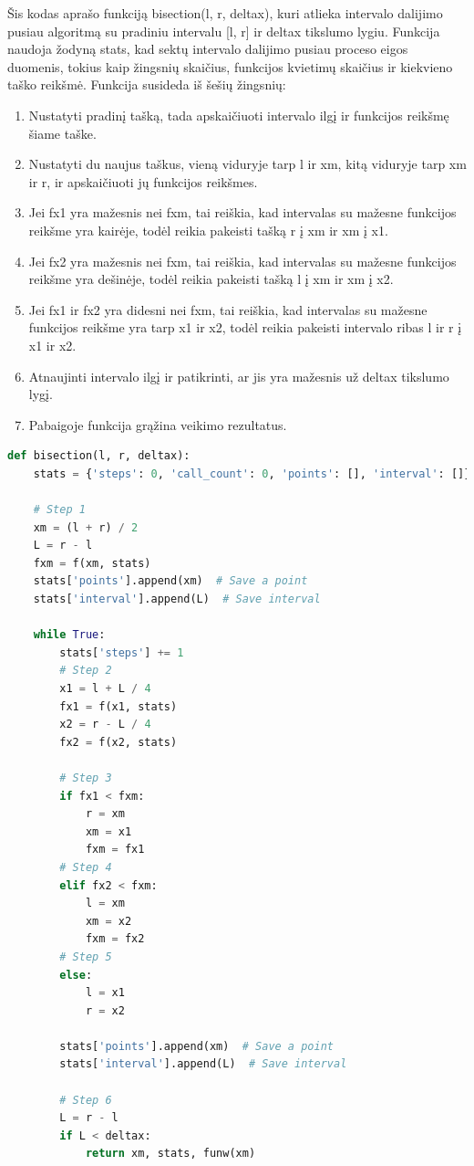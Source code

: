 \documentclass{VUMIFPSkursinis}
\begin{document}
Šis kodas aprašo funkciją bisection(l, r, deltax), kuri atlieka intervalo dalijimo pusiau algoritmą su pradiniu intervalu [l, r] ir deltax tikslumo lygiu. Funkcija naudoja žodyną stats, kad sektų intervalo dalijimo pusiau proceso eigos duomenis, tokius kaip žingsnių skaičius, funkcijos kvietimų skaičius ir kiekvieno taško reikšmė. Funkcija susideda iš šešių žingsnių:
\begin{enumerate}
  \item Nustatyti pradinį tašką, tada apskaičiuoti intervalo ilgį ir funkcijos reikšmę šiame taške.
  \item Nustatyti du naujus taškus, vieną viduryje tarp l ir xm, kitą viduryje tarp xm ir r,
        ir apskaičiuoti jų funkcijos reikšmes.
  \item Jei fx1 yra mažesnis nei fxm, tai reiškia, kad intervalas su mažesne funkcijos reikšme yra kairėje,
        todėl reikia pakeisti tašką r į xm ir xm į x1.
  \item Jei fx2 yra mažesnis nei fxm, tai reiškia, kad intervalas su mažesne funkcijos reikšme yra dešinėje,
        todėl reikia pakeisti tašką l į xm ir xm į x2.
  \item Jei fx1 ir fx2 yra didesni nei fxm, tai reiškia, kad intervalas su mažesne funkcijos
        reikšme yra tarp x1 ir x2, todėl reikia pakeisti intervalo ribas l ir r į x1 ir x2.
  \item Atnaujinti intervalo ilgį ir patikrinti, ar jis yra mažesnis už deltax tikslumo lygį.
  \item Pabaigoje funkcija grąžina veikimo rezultatus.
\end{enumerate}

\begin{lstlisting}[language=Python]
def bisection(l, r, deltax):
    stats = {'steps': 0, 'call_count': 0, 'points': [], 'interval': []}

    # Step 1
    xm = (l + r) / 2
    L = r - l
    fxm = f(xm, stats)
    stats['points'].append(xm)  # Save a point
    stats['interval'].append(L)  # Save interval

    while True:
        stats['steps'] += 1
        # Step 2
        x1 = l + L / 4
        fx1 = f(x1, stats)
        x2 = r - L / 4
        fx2 = f(x2, stats)

        # Step 3
        if fx1 < fxm:
            r = xm
            xm = x1
            fxm = fx1
        # Step 4
        elif fx2 < fxm:
            l = xm
            xm = x2
            fxm = fx2
        # Step 5
        else:
            l = x1
            r = x2

        stats['points'].append(xm)  # Save a point
        stats['interval'].append(L)  # Save interval

        # Step 6
        L = r - l
        if L < deltax:
            return xm, stats, funw(xm)
\end{lstlisting}
\end{document}
